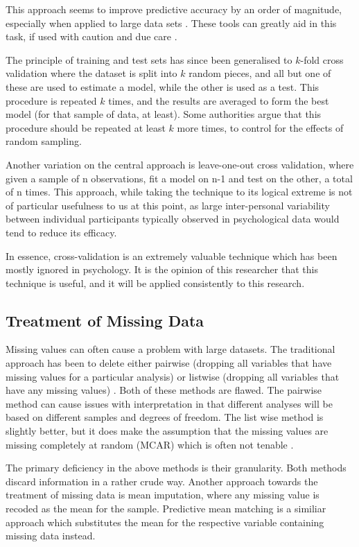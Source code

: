 This approach seems to improve predictive accuracy by an order of magnitude, especially when applied to large data sets  \cite{breiman2001statistical}.  These tools can greatly aid in this task, if used with caution and due care \cite{friedman2009elements}.

The principle of training and test sets has since been generalised to $k$-fold cross validation where the dataset is split into $k$ random pieces, and all but one of these are used to estimate a model, while the other is used as a test. This procedure is repeated $k$ times, and the results are averaged to form the best model (for that sample of data, at least). Some authorities argue that this procedure should be repeated at least $k$ more times, to control for the effects of random sampling\cite{friedman2009elements}.

Another variation on the central approach is leave-one-out cross validation, where given a sample of n observations, fit a model on n-1 and test on the other, a total of n times. This approach, while taking the technique to its logical extreme is not of particular usefulness to us at this point, as large inter-personal variability between individual participants typically observed in psychological data would tend to reduce its efficacy\cite{friedman2009elements}.

In essence, cross-validation is an extremely valuable technique which has been mostly ignored in psychology. It is the opinion of this researcher  that this technique is useful, and it will be applied consistently to this research.

\subsection{Treatment of Missing Data}


Missing values can often cause a problem with large datasets. The
traditional approach has been to delete either pairwise (dropping
all variables that have missing values for a particular analysis)
or listwise (dropping all variables that have any missing values) \cite{graham2009missing}.
Both of these methods are flawed. The pairwise method can cause issues
with interpretation in that different analyses will be based on different
samples and degrees of freedom. The list wise method is slightly better,
but it does make the assumption that the missing values are missing
completely at random (MCAR) which is often not tenable \cite{graham2009missing}.

The primary deficiency in the above methods is their granularity. Both methods discard information in a rather crude way. Another approach towards the treatment of missing data is mean imputation, where any missing value is recoded as the mean for the sample. Predictive mean matching is a similiar approach which substitutes the mean for the respective variable containing missing data instead.

